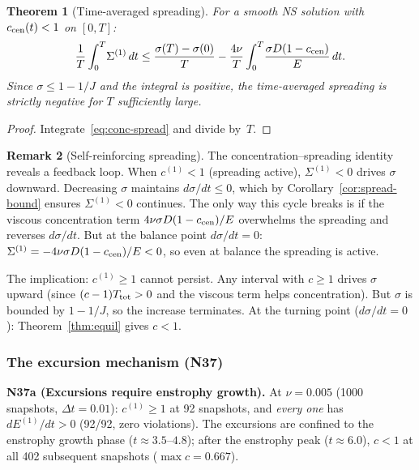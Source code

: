\documentclass[11pt]{article}
\newtheorem{theorem}{Theorem}[section]
\theoremstyle{definition}
\newtheorem{remark}[theorem]{Remark}
\begin{document}
\begin{theorem}[Time-averaged spreading]
\label{thm:time-avg}
For a smooth NS solution with $c_{\rm cen}(t)<1$
on $[0,T]$:
\begin{equation}\label{eq:time-avg}
\frac{1}{T}\int_0^T\!\Sigma^{(1)}\,dt
\leq \frac{\sigma(T)-\sigma(0)}{T}
- \frac{4\nu}{T}\int_0^T\!
\frac{\sigma D(1-c_{\rm cen})}{E}\,dt.
\end{equation}
Since $\sigma\leq 1-1/J$ and the integral is
positive, the time-averaged spreading is strictly
negative for $T$ sufficiently large.
\end{theorem}

\begin{proof}
Integrate~\eqref{eq:conc-spread} and divide by~$T$.
\end{proof}

\begin{remark}[Self-reinforcing spreading]
\label{rem:self-reinforce}
The concentration--spreading identity reveals a
feedback loop.  When $c^{(1)}<1$ (spreading active),
$\Sigma^{(1)}<0$ drives $\sigma$ downward.
Decreasing $\sigma$ maintains $d\sigma/dt\leq 0$,
which by Corollary~\ref{cor:spread-bound} ensures
$\Sigma^{(1)}<0$ continues.  The only way this
cycle breaks is if the viscous concentration term
$4\nu\sigma D(1-c_{\rm cen})/E$ overwhelms the
spreading and reverses $d\sigma/dt$.  But at the
balance point $d\sigma/dt=0$:
$\Sigma^{(1)} = -4\nu\sigma D(1-c_{\rm cen})/E<0$,
so even at balance the spreading is active.

The implication: $c^{(1)}\geq 1$ cannot persist.
Any interval with $c\geq 1$ drives $\sigma$ upward
(since $(c-1)T_{\rm tot}>0$ and the viscous term
helps concentration).  But $\sigma$ is bounded by
$1-1/J$, so the increase terminates.  At the
turning point ($d\sigma/dt=0$):
Theorem~\ref{thm:equil} gives $c<1$.
\end{remark}

\subsubsection{The excursion mechanism (N37)}

\medskip\noindent\textbf{N37a (Excursions require
enstrophy growth).}
At $\nu=0.005$ (1000 snapshots, $\Delta t=0.01$):
$c^{(1)}\geq 1$ at 92 snapshots, and \emph{every one}
has $dE^{(1)}/dt>0$ (92/92, zero violations).
The excursions are confined to the enstrophy growth
phase ($t\approx 3.5$--$4.8$); after the enstrophy
peak ($t\approx 6.0$), $c<1$ at all 402 subsequent
snapshots ($\max c = 0.667$).
\end{document}
